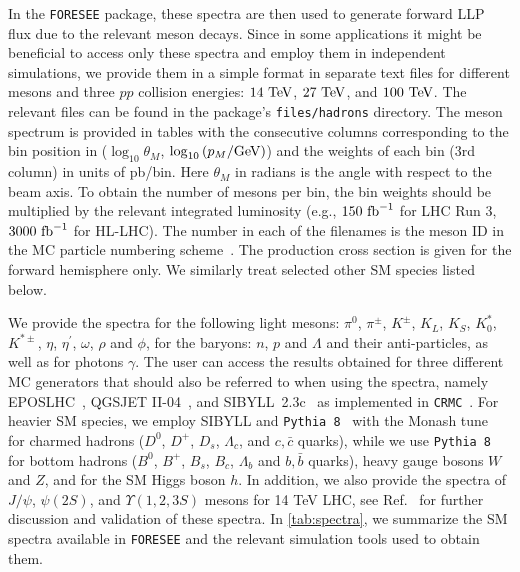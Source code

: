 \documentclass[prd,twocolumn,reprint,preprintnumbers,nofootinbib]{revtex4-1}
\begin{document}
In the \texttt{FORESEE} package, these spectra are then used to generate forward LLP flux due to the relevant meson decays. Since in some applications it might be beneficial to access only these spectra and employ them in independent simulations, we provide them in a simple format in separate text files for different mesons and three $pp$ collision energies: $14~\text{TeV}$, $27~\text{TeV}$, and $100~\text{TeV}$. The relevant files can be found in the package's \texttt{files/hadrons} directory. The meson spectrum is provided in tables with the consecutive columns corresponding to the bin position in ($\log_{10}{\theta_M}$, $\log_{10}{(p_M/\text{GeV})}$) and the weights of each bin ($3$rd column) in units of pb/bin. Here $\theta_M$ in radians is the angle with respect to the beam axis. To obtain the number of mesons per bin, the bin weights should be multiplied by the relevant integrated luminosity (e.g., $150~\text{fb}^{-1}$ for LHC Run 3, $3000~\text{fb}^{-1}$ for HL-LHC). The number in each of the filenames is the meson ID in the MC particle numbering scheme~\cite{Zyla:2020zbs}. The production cross section is given for the forward hemisphere only. We similarly treat selected other SM species listed below.

We provide the spectra for the following light mesons: $\pi^0$, $\pi^\pm$, $K^\pm$, $K_L$, $K_S$, $K_0^*$, $K^{*\pm}$, $\eta$, $\eta^\prime$, $\omega$, $\rho$ and $\phi$, for the baryons: $n$, $p$ and $\Lambda$ and their anti-particles, as well as for photons $\gamma$. The user can access the results obtained for three different MC generators that should also be referred to when using the spectra, namely EPOSLHC~\cite{Pierog:2013ria}, QGSJET II-04~\cite{Ostapchenko:2010vb}, and SIBYLL~2.3c~\cite{Ahn:2009wx,Riehn:2015oba} as implemented in \texttt{CRMC}~\cite{CRMC}. For heavier SM species, we employ SIBYLL and \texttt{Pythia~8}~\cite{Sjostrand:2006za, Sjostrand:2014zea} with the Monash tune~\cite{Skands:2014pea} for charmed hadrons ($D^0$, $D^+$, $D_s$, $\Lambda_c$, and $c,\bar c$ quarks), while we use \texttt{Pythia~8} for bottom hadrons ($B^0$, $B^+$, $B_s$, $B_c$, $\Lambda_b$ and $b, \bar b$ quarks), heavy gauge bosons $W$ and $Z$, and for the SM Higgs boson $h$. In addition, we also provide the spectra of $J/\psi$, $\psi(2S)$, and $\Upsilon(1,2,3S)$ mesons for 14 TeV LHC, see Ref.~\cite{Foroughi-Abari:2020qar} for further discussion and validation of these spectra. In \cref{tab:spectra}, we summarize the SM spectra available in \texttt{FORESEE} and the relevant simulation tools used to obtain them.

\end{document}
